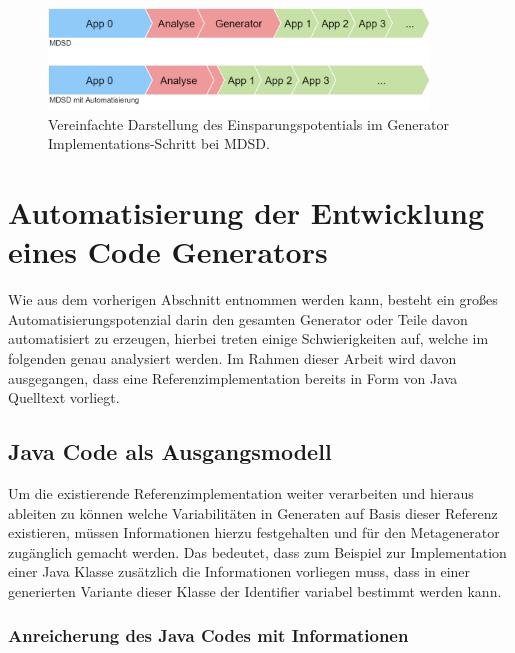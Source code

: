 \documentclass[12pt,oneside,a4paper,parskip]{scrbook}
\begin{document}
\begin{figure}[htbp]
	\centering
	\includegraphics[width=0.9\textwidth]{bilder/vergleich_2}
	\caption{Vereinfachte Darstellung des Einsparungspotentials im Generator Implementations-Schritt bei MDSD.}
	\label{fig:vgl2}
\end{figure}


\section{Automatisierung der Entwicklung eines Code Generators}

Wie aus dem vorherigen Abschnitt entnommen werden kann, besteht ein großes Automatisierungspotenzial darin den gesamten Generator oder Teile davon automatisiert zu erzeugen, hierbei treten einige Schwierigkeiten auf, welche im folgenden genau analysiert werden. Im Rahmen dieser Arbeit wird davon ausgegangen, dass eine Referenzimplementation bereits in Form von Java Quelltext vorliegt.

\subsection{Java Code als Ausgangsmodell}

Um die existierende Referenzimplementation weiter verarbeiten und hieraus ableiten zu können welche Variabilitäten in Generaten auf Basis dieser Referenz existieren, müssen Informationen hierzu festgehalten und für den Metagenerator zugänglich gemacht werden. Das bedeutet, dass zum Beispiel zur Implementation einer Java Klasse zusätzlich die Informationen vorliegen muss, dass in einer generierten Variante dieser Klasse der Identifier variabel bestimmt werden kann.

\subsubsection{Anreicherung des Java Codes mit Informationen}
\end{document}
